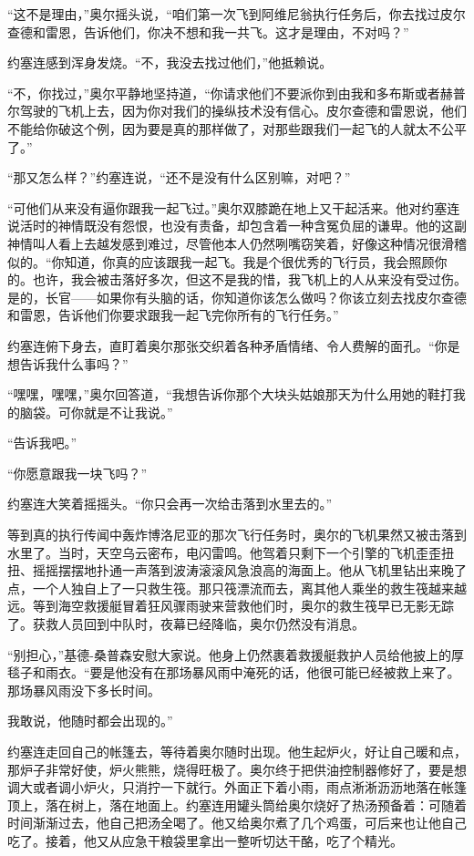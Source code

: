     “这不是理由，”奥尔摇头说，“咱们第一次飞到阿维尼翁执行任务后，你去找过皮尔查德和雷恩，告诉他们，你决不想和我一共飞。这才是理由，不对吗？”

    约塞连感到浑身发烧。“不，我没去找过他们，”他抵赖说。

    “不，你找过，”奥尔平静地坚持道，“你请求他们不要派你到由我和多布斯或者赫普尔驾驶的飞机上去，因为你对我们的操纵技术没有信心。皮尔查德和雷恩说，他们不能给你破这个例，因为要是真的那样做了，对那些跟我们一起飞的人就太不公平了。”

    “那又怎么样？”约塞连说，“还不是没有什么区别嘛，对吧？”

    “可他们从来没有逼你跟我一起飞过。”奥尔双膝跪在地上又干起活来。他对约塞连说活时的神情既没有怨恨，也没有责备，却包含着一种含冤负屈的谦卑。他的这副神情叫人看上去越发感到难过，尽管他本人仍然咧嘴窃笑着，好像这种情况很滑稽似的。“你知道，你真的应该跟我一起飞。我是个很优秀的飞行员，我会照顾你的。也许，我会被击落好多次，但这不是我的惜，我飞机上的人从来没有受过伤。是的，长官——如果你有头脑的话，你知道你该怎么做吗？你该立刻去找皮尔查德和雷恩，告诉他们你要求跟我一起飞完你所有的飞行任务。”

    约塞连俯下身去，直盯着奥尔那张交织着各种矛盾情绪、令人费解的面孔。“你是想告诉我什么事吗？”

    “嘿嘿，嘿嘿，”奥尔回答道，“我想告诉你那个大块头姑娘那天为什么用她的鞋打我的脑袋。可你就是不让我说。”

    “告诉我吧。”

    “你愿意跟我一块飞吗？”

    约塞连大笑着摇摇头。“你只会再一次给击落到水里去的。”

    等到真的执行传闻中轰炸博洛尼亚的那次飞行任务时，奥尔的飞机果然又被击落到水里了。当时，天空乌云密布，电闪雷鸣。他驾着只剩下一个引擎的飞机歪歪扭扭、摇摇摆摆地扑通一声落到波涛滚滚风急浪高的海面上。他从飞机里钻出来晚了点，一个人独自上了一只救生筏。那只筏漂流而去，离其他人乘坐的救生筏越来越远。等到海空救援艇冒着狂风骤雨驶来营救他们时，奥尔的救生筏早已无影无踪了。获救人员回到中队时，夜幕已经降临，奥尔仍然没有消息。

    “别担心，”基德-桑普森安慰大家说。他身上仍然裹着救援艇救护人员给他披上的厚毯子和雨衣。“要是他没有在那场暴风雨中淹死的话，他很可能已经被救上来了。那场暴风雨没下多长时间。

    我敢说，他随时都会出现的。”

    约塞连走回自己的帐篷去，等待着奥尔随时出现。他生起炉火，好让自己暖和点，那炉子非常好使，炉火熊熊，烧得旺极了。奥尔终于把供油控制器修好了，要是想调大或者调小炉火，只消拧一下就行。外面正下着小雨，雨点淅淅沥沥地落在帐篷顶上，落在树上，落在地面上。约塞连用罐头筒给奥尔烧好了热汤预备着：可随着时间渐渐过去，他自己把汤全喝了。他又给奥尔煮了几个鸡蛋，可后来也让他自己吃了。接着，他又从应急干粮袋里拿出一整听切达干酪，吃了个精光。

